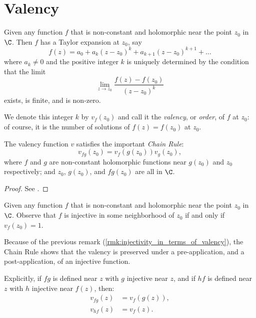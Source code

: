 \section{Valency}

\begin{definition}[Valency of $f$ at $z_0 \in \C$]
    \label{def:valency_in_C}
    Given any function $f$ that is non-constant and holomorphic near the point
    $z_0$ in $\C$. Then $f$ has a Taylor expansion at $z_0$, say
    \[
        f(z) = a_0 + a_k(z-z_0)^k + a_{k+1}(z-z_0)^{k+1} + \dots
    \]
    where $a_k \neq 0$ and the positive integer $k$ is uniquely determined by
    the condition that the limit
    \[
        \lim_{z \to z_0} \frac{f(z)-f(z_0)}{(z-z_0)^k}
    \]
    exists, is finite, and is non-zero. 
    
    We denote this integer $k$ by $v_f(z_0)$ and call it the \emph{valency}, or
    \emph{order}, of $f$ at $z_0$: of course, it is the number of solutions of
    $f(z) = f(z_0)$ at $z_0$.
\end{definition}

\begin{proposition}
    The valency function $v$ satisfies the important \emph{Chain Rule}:
    \[
        v_{fg}(z_0) = v_f(g(z_0))v_g(z_0),
    \]
    where $f$ and $g$ are non-constant holomorphic functions near $g(z_0)$ and
    $z_0$ respectively; and $z_0$, $g(z_0)$, and $fg(z_0)$ are all in $\C$.
\end{proposition}
\begin{proof}
    See \cite[37-38]{Beardon1991}.
\end{proof}

\begin{remark}
    \label{rmk:injectivity_in_terms_of_valency}
    Given any function $f$ that is non-constant and holomorphic near the point
    $z_0$ in $\C$. Observe that $f$ is injective in some neighborhood of $z_0$
    if and only if $v_f(z_0) = 1$.
\end{remark}

\begin{remark}
    Because of the previous remark (\ref{rmk:injectivity_in_terms_of_valency}),
    the Chain Rule shows that the valency is preserved under a pre-application,
    and a post-application, of an injective function.

    Explicitly, if $fg$ is defined near $z$ with $g$ injective near $z$, and if
    $hf$ is defined near $z$ with $h$ injective near $f(z)$, then:
    \begin{align*}
        v_{fg}(z) &= v_f(g(z)), \\
        v_{hf}(z) &= v_f(z).
    \end{align*}
\end{remark}

